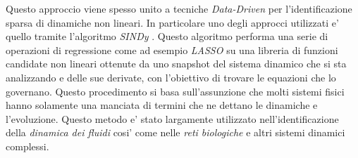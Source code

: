 Questo approccio viene spesso unito a tecniche \emph{Data-Driven} \cite{datadrivendiffeq} per l'identificazione
sparsa di dinamiche non lineari. In particolare uno degli approcci utilizzati 
e' quello tramite l'algoritmo \emph{SINDy} \cite{wiki:Sparse_identification_of_non-linear_dynamics}. 
Questo algoritmo performa una serie di operazioni di regressione come 
ad esempio \emph{LASSO} su una libreria di funzioni candidate non lineari ottenute
da uno snapshot del sistema dinamico che si sta analizzando e delle sue derivate, 
con l'obiettivo di trovare le equazioni che lo governano. Questo procedimento 
si basa sull'assunzione che molti sistemi fisici hanno solamente una manciata di 
termini che ne dettano le dinamiche e l'evoluzione. Questo metodo e' stato largamente
utilizzato nell'identificazione della \emph{dinamica dei fluidi} cosi' come
nelle \emph{reti biologiche} e altri sistemi dinamici complessi.